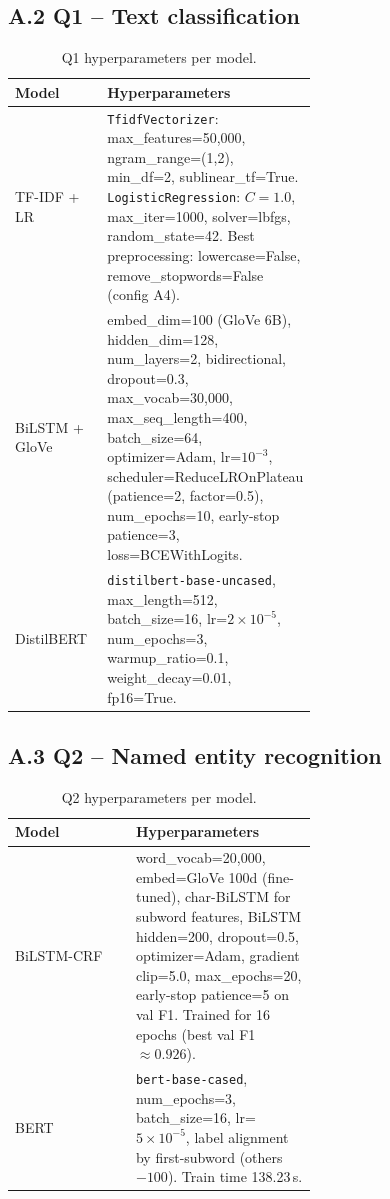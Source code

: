 \documentclass[12pt, a4paper]{article}
\begin{document}
\subsection*{A.2 Q1 -- Text classification}
\begin{table}[H]
\centering
\caption{Q1 hyperparameters per model.}
\begin{tabular}{lp{0.6\linewidth}}
\toprule
\textbf{Model} & \textbf{Hyperparameters} \\
\midrule
TF-IDF + LR    & \texttt{TfidfVectorizer}: max\_features=50{,}000, ngram\_range=(1,2), min\_df=2, sublinear\_tf=True. \texttt{LogisticRegression}: $C=1.0$, max\_iter=1000, solver=lbfgs, random\_state=42. Best preprocessing: lowercase=False, remove\_stopwords=False (config A4). \\
BiLSTM + GloVe & embed\_dim=100 (GloVe 6B), hidden\_dim=128, num\_layers=2, bidirectional, dropout=0.3, max\_vocab=30{,}000, max\_seq\_length=400, batch\_size=64, optimizer=Adam, lr=$10^{-3}$, scheduler=ReduceLROnPlateau (patience=2, factor=0.5), num\_epochs=10, early-stop patience=3, loss=BCEWithLogits. \\
DistilBERT     & \texttt{distilbert-base-uncased}, max\_length=512, batch\_size=16, lr=$2\!\times\!10^{-5}$, num\_epochs=3, warmup\_ratio=0.1, weight\_decay=0.01, fp16=True. \\
\bottomrule
\end{tabular}
\end{table}

\subsection*{A.3 Q2 -- Named entity recognition}
\begin{table}[H]
\centering
\caption{Q2 hyperparameters per model.}
\begin{tabular}{lp{0.6\linewidth}}
\toprule
\textbf{Model} & \textbf{Hyperparameters} \\
\midrule
BiLSTM-CRF & word\_vocab=20{,}000, embed=GloVe 100d (fine-tuned), char-BiLSTM for subword features, BiLSTM hidden=200, dropout=0.5, optimizer=Adam, gradient clip=5.0, max\_epochs=20, early-stop patience=5 on val F1. Trained for 16 epochs (best val F1 $\approx 0.926$). \\
BERT       & \texttt{bert-base-cased}, num\_epochs=3, batch\_size=16, lr=$5\!\times\!10^{-5}$, label alignment by first-subword (others $-100$). Train time 138.23\,s. \\
\bottomrule
\end{tabular}
\end{table}
\end{document}
